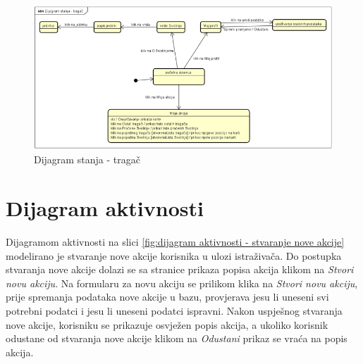 		\begin{figure}[H]
			\includegraphics[scale=0.5]{slike/dijagram stanja - tragač.png}
			\centering
			\caption{Dijagram stanja - tragač}
			\label{fig:dijagram stanja - tragač}
		\end{figure}
			
			\eject 
		
		\section{Dijagram aktivnosti}

		Dijagramom aktivnosti na slici  \ref{fig:dijagram aktivnosti - stvaranje nove akcije} modelirano je stvaranje nove akcije korisnika u ulozi istraživača.
		Do postupka stvaranja nove akcije dolazi se sa stranice prikaza popisa akcija klikom na 
		\textit{Stvori novu akciju}. Na formularu za novu akciju se prilikom klika na \textit{Stvori novu akciju},
		prije spremanja podataka nove akcije u bazu, provjerava jesu li uneseni svi potrebni podatci i jesu li uneseni podatci ispravni.
		Nakon uspješnog stvaranja nove akcije, korisniku se prikazuje osvježen popis akcija, a ukoliko korisnik odustane od stvaranja nove akcije klikom na 
		\textit{Odustani} prikaz se vraća na popis akcija.

